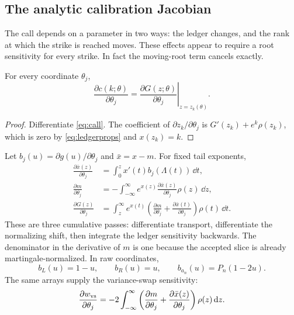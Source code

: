 \subsection{The analytic calibration Jacobian}
\label{sec:jacobian}

The call depends on a parameter in two ways: the ledger changes, and the rank
at which the strike is reached moves.  These effects appear to require a root
sensitivity for every strike.  In fact the moving-root term cancels exactly.

\begin{theorem}
\label{thm:envelope}
For every coordinate $\theta_j$,
\begin{equation}
\frac{\partial c(k;\theta)}{\partial\theta_j}
=\left.\frac{\partial G(z;\theta)}{\partial\theta_j}
\right|_{z=z_k(\theta)}.
\label{eq:envelope}
\end{equation}
\end{theorem}

\begin{proof}
Differentiate \eqref{eq:call}.  The coefficient of
$\partial z_k/\partial\theta_j$ is
$G'(z_k)+e^k\rho(z_k)$, which is zero by \eqref{eq:ledgerprops} and
$x(z_k)=k$.
\end{proof}

Let $b_j(u)=\partial g(u)/\partial\theta_j$ and
$\bar x=x-m$.  For fixed tail exponents,
\begin{align}
\frac{\partial\bar x(z)}{\partial\theta_j}
&=\int_0^z x'(t)b_j(\Lambda(t))\,\dd t,
\label{eq:pass1}\\
\frac{\partial m}{\partial\theta_j}
&=-\int_{-\infty}^{\infty}e^{x(z)}
\frac{\partial\bar x(z)}{\partial\theta_j}\rho(z)\,\dd z,
\label{eq:pass2}\\
\frac{\partial G(z)}{\partial\theta_j}
&=\int_z^\infty e^{x(t)}
\left(\frac{\partial m}{\partial\theta_j}
+\frac{\partial\bar x(t)}{\partial\theta_j}\right)
\rho(t)\,\dd t.
\label{eq:pass3}
\end{align}
These are three cumulative passes: differentiate transport, differentiate the
normalizing shift, then integrate the ledger sensitivity backwards.  The
denominator in the derivative of $m$ is one because the accepted slice is
already martingale-normalized.  In raw coordinates,
\[
b_L(u)=1-u,\qquad b_R(u)=u,\qquad
b_{a_n}(u)=P_n(1-2u).
\]
The same arrays supply the variance-swap sensitivity:
\begin{equation}
\frac{\partial w_{\rm vs}}{\partial\theta_j}
=-2\int_{-\infty}^{\infty}
\left(\frac{\partial m}{\partial\theta_j}
+\frac{\partial\bar x(z)}{\partial\theta_j}\right)
\rho(z)\,\mathrm{d} z.
\label{eq:varswaprow}
\end{equation}

